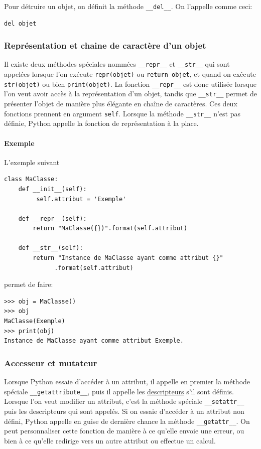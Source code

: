 \documentclass[a4paper, 10pt]{article}
\begin{document}
Pour détruire un objet, on définit la méthode \texttt{__del__}. On l'appelle comme ceci:
\begin{verbatim}
del objet
\end{verbatim}

\subsubsection{Représentation et chaine de caractère d'un objet}
Il existe deux méthodes spéciales nommées \texttt{__repr__} et \texttt{__str__} qui sont appelées lorsque l'on exécute \texttt{repr(objet)} ou \texttt{return objet}, et quand on exécute \texttt{str(objet)} ou bien \texttt{print(objet)}. La fonction \texttt{__repr__} est donc utilisée lorsque l'on veut avoir accès à la représentation d'un objet, tandis que \texttt{__str__} permet de présenter l'objet de manière plus élégante en chaîne de caractères. Ces deux fonctions prennent en argument \texttt{self}. Lorsque la méthode \texttt{__str__} n'est pas définie, Python appelle la fonction de représentation à la place.

\paragraph{Exemple} L'exemple suivant
\begin{verbatim}
class MaClasse:
    def __init__(self):
         self.attribut = 'Exemple'

    def __repr__(self):
        return "MaClasse({})".format(self.attribut)

    def __str__(self):
        return "Instance de MaClasse ayant comme attribut {}"
              .format(self.attribut)
\end{verbatim}
permet de faire:
\begin{Verbatim}[frame=single, fontsize=\footnotesize]
>>> obj = MaClasse()
>>> obj
MaClasse(Exemple)
>>> print(obj)
Instance de MaClasse ayant comme attribut Exemple.
\end{Verbatim}

\subsubsection{Accesseur et mutateur}
Lorsque Python essaie d'accéder à un attribut, il appelle en premier la méthode spéciale \texttt{__getattribute__}, puis il appelle les \hyperref[sec:proprietes]{descripteurs} s'il sont définis. Lorsque l'on veut modifier un attribut, c'est la méthode spéciale \texttt{__setattr__} puis les descripteurs qui sont appelés. Si on essaie d'accéder à un attribut non défini, Python appelle en guise de dernière chance la méthode \texttt{__getattr__}. On peut personnaliser cette fonction de manière à ce qu'elle envoie une erreur, ou bien à ce qu'elle redirige vers un autre attribut ou effectue un calcul.
\end{document}
